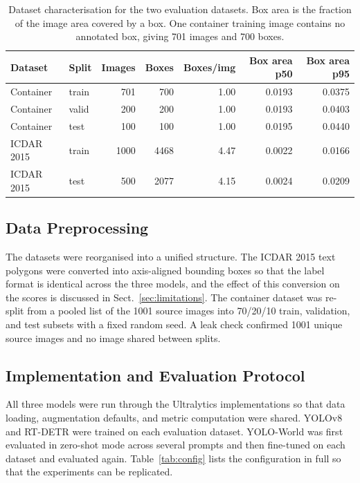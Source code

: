 \documentclass[conference]{IEEEtran}
\begin{document}
\begin{table}[tb]
\centering
\caption{Dataset characterisation for the two evaluation datasets. Box area is the fraction of the image area covered by a box. One container training image contains no annotated box, giving 701 images and 700 boxes.}
\label{tab:dataset}
\begin{tabular}{llrrrrr}
\toprule
Dataset & Split & Images & Boxes & Boxes/img & Box area p50 & Box area p95 \\
\midrule
Container & train & 701 & 700 & 1.00 & 0.0193 & 0.0375 \\
Container & valid & 200 & 200 & 1.00 & 0.0193 & 0.0403 \\
Container & test  & 100 & 100 & 1.00 & 0.0195 & 0.0440 \\
ICDAR 2015 & train & 1000 & 4468 & 4.47 & 0.0022 & 0.0166 \\
ICDAR 2015 & test  & 500 & 2077 & 4.15 & 0.0024 & 0.0209 \\
\bottomrule
\end{tabular}
\end{table}

\subsection{Data Preprocessing}
\label{sec:preproc}

The datasets were reorganised into a unified structure. The ICDAR 2015 text polygons were converted into axis-aligned bounding boxes so that the label format is identical across the three models, and the effect of this conversion on the scores is discussed in Sect.~\ref{sec:limitations}. The container dataset was re-split from a pooled list of the 1001 source images into 70/20/10 train, validation, and test subsets with a fixed random seed. A leak check confirmed 1001 unique source images and no image shared between splits.

\subsection{Implementation and Evaluation Protocol}
\label{sec:protocol}

All three models were run through the Ultralytics implementations so that data loading, augmentation defaults, and metric computation were shared. YOLOv8 and RT-DETR were trained on each evaluation dataset. YOLO-World was first evaluated in zero-shot mode across several prompts and then fine-tuned on each dataset and evaluated again. Table~\ref{tab:config} lists the configuration in full so that the experiments can be replicated.
\end{document}
